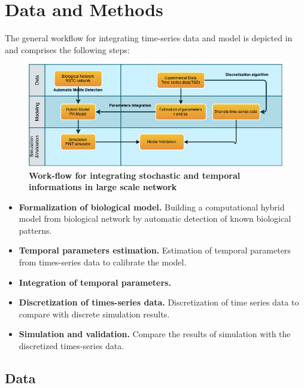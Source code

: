 
\section{Data and Methods}


The general workflow for integrating time-series data and model is depicted in  and comprises the following steps:

\begin{figure}[!t]
 \centering
 \includegraphics[width=6.5in]{images/workflow-2.png}
\caption{{\bf Work-flow for integrating stochastic and temporal informations in large scale network}} 
 \label{fig:workflow}
\end{figure}

\begin{itemize}
 \item \textbf{Formalization of biological model.} Building a computational hybrid model  from biological network by automatic detection of known biological patterns.
 \item \textbf{Temporal parameters estimation.} Estimation of temporal parameters from times-series data to calibrate the model.
 \item \textbf{Integration of temporal parameters.} 
 \item \textbf{Discretization of times-series data.} Discretization of time series data to compare with discrete simulation results.
 \item \textbf{Simulation and validation.} Compare the results of simulation with the discretized times-series data.
\end{itemize}

\subsection{Data}

